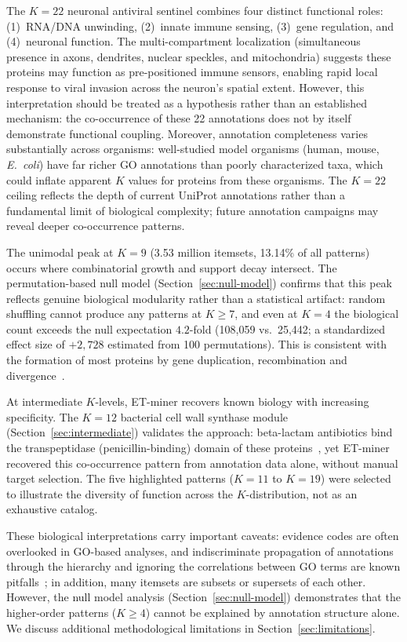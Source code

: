 \documentclass[10pt,a4paper,twocolumn]{article}
\begin{document}
The $K{=}22$ neuronal antiviral sentinel combines four distinct functional roles: (1)~RNA/DNA unwinding, (2)~innate immune sensing, (3)~gene regulation, and (4)~neuronal function. The multi-compartment localization (simultaneous presence in axons, dendrites, nuclear speckles, and mitochondria) suggests these proteins may function as pre-positioned immune sensors, enabling rapid local response to viral invasion across the neuron's spatial extent. However, this interpretation should be treated as a hypothesis rather than an established mechanism: the co-occurrence of these 22 annotations does not by itself demonstrate functional coupling. Moreover, annotation completeness varies substantially across organisms: well-studied model organisms (human, mouse, \emph{E.~coli}) have far richer GO annotations than poorly characterized taxa, which could inflate apparent $K$ values for proteins from these organisms. The $K{=}22$ ceiling reflects the depth of current UniProt annotations rather than a fundamental limit of biological complexity; future annotation campaigns may reveal deeper co-occurrence patterns.

The unimodal peak at $K{=}9$ (3.53 million itemsets, 13.14\% of all patterns) occurs where combinatorial growth and support decay intersect. The permutation-based null model (Section~\ref{sec:null-model}) confirms that this peak reflects genuine biological modularity rather than a statistical artifact: random shuffling cannot produce any patterns at $K{\geq}7$, and even at $K{=}4$ the biological count exceeds the null expectation $4.2$-fold (108,059 vs.\ 25,442; a standardized effect size of $+2{,}728$ estimated from 100 permutations). This is consistent with the formation of most proteins by gene duplication, recombination and divergence~\cite{chothia2003}.

At intermediate $K$-levels, ET-miner recovers known biology with increasing specificity. The $K{=}12$ bacterial cell wall synthase module (Section~\ref{sec:intermediate}) validates the approach: beta-lactam antibiotics bind the transpeptidase (penicillin-binding) domain of these proteins~\cite{sauvage2008}, yet ET-miner recovered this co-occurrence pattern from annotation data alone, without manual target selection. The five highlighted patterns ($K{=}11$ to $K{=}19$) were selected to illustrate the diversity of function across the $K$-distribution, not as an exhaustive catalog.

These biological interpretations carry important caveats: evidence codes are often overlooked in GO-based analyses, and indiscriminate propagation of annotations through the hierarchy and ignoring the correlations between GO terms are known pitfalls~\cite{rhee2008}; in addition, many itemsets are subsets or supersets of each other. However, the null model analysis (Section~\ref{sec:null-model}) demonstrates that the higher-order patterns ($K{\geq}4$) cannot be explained by annotation structure alone. We discuss additional methodological limitations in Section~\ref{sec:limitations}.
\end{document}
